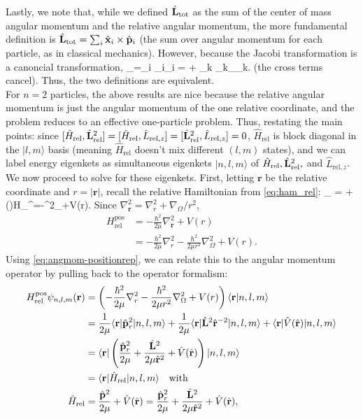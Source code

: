Lastly, we note that, while we defined $\hat{\mathbf{L}}_{\text{tot}}$ as the sum of the center of mass angular momentum and the relative angular momentum, the more fundamental definition is $\hat{\mathbf{L}}_\text{tot}=\sum_i \hat{\mathbf{x}}_i\times\hat{\mathbf{p}}_i$ (the sum over angular momentum for each particle, as in classical mechanics). However, because the Jacobi transformation is a canoncial transformation,
\bea
    _=\sum_i _i\times {}_i = \times {} + \sum_k \vecop{\rho}_k\times {}_{\mathbf{\rho}_k}.
\eea
(the cross terms cancel). Thus, the two definitions are equivalent.\\

For $n=2$ particles, the above results are nice because the relative angular momentum is just the angular momentum of the one relative coordinate, and the problem reduces to an effective one-particle problem. Thus, restating the main points: since $[\hat{H}_\text{rel},\hat{\mathbf{L}}_\text{rel}^2]=[\hat{H}_\text{rel},\hat{L}_{\text{rel},z}]=[\hat{\mathbf{L}}^2_\text{rel}, \hat{L}_{\text{rel},z}]=0$, $\hat{H}_{\text{rel}}$ is block diagonal in the $|l,m\rangle$ basis (meaning $\hat{H}_\text{rel}$ doesn't mix different $(l,m)$ states), and we can label energy eigenkets as simultaneous eigenkets $|n,l,m\rangle$ of $\hat{H}_\text{rel}, \hat{\mathbf{L}}^2_\text{rel},$ and $\hat{L}_{\text{rel},z}$. We now proceed to solve for these eigenkets. First, letting $\mathbf{r}$ be the relative coordinate and $r=|\mathbf{r}|$, recall the relative Hamiltonian from \cref{eq:ham_rel}:
\bea
    _ = +()\rightarrow H_^=-\nabla^2_+V(r).
\eea
Since $\nabla^2_{\mathbf{r}} = \nabla^2_r + \nabla_{\Omega}/r^2$,
\begin{align*}
    H^{\text{pos}}_{\text{rel}} &= -\frac{\hbar^2}{2\mu}\nabla^2_\mathbf{r}+V(r) \\
    &= -\frac{\hbar^2}{2\mu}\nabla^2_r-\frac{\hbar^2}{2\mu r^2}\nabla^2_{\Omega} + V(r).
\end{align*}
Using \cref{eq:angmom-positionrep}, we can relate this to the angular momentum operator by pulling back to the operator formalism:
\begin{align*}
    H_\text{rel}^{\text{pos}}\psi_{n,l,m}(\mathbf{r}) &= \left(-\frac{\hbar^2}{2\mu}\nabla^2_r-\frac{\hbar^2}{2\mu r^2}\nabla^2_{\Omega} + V(r)\right)\langle\mathbf{r}|n,l,m\rangle\\
    &= \frac{1}{2\mu}\langle\mathbf{r}|\hat{\mathbf{p}}^2_{r}|n,l,m\rangle +\frac{1}{2\mu}\langle\mathbf{r}|\hat{\mathbf{L}}^2\hat{\mathbf{r}}^{-2}|n,l,m\rangle+\langle \mathbf{r}|\hat{V}(\hat{\mathbf{r}})|n,l,m\rangle\\
    &= \langle \mathbf{r}|\left(\frac{\hat{\mathbf{p}}^2_r}{2\mu}+\frac{\hat{\mathbf{L}}^2}{2\mu\hat{\mathbf{r}}^2} + \hat{V}(\hat{\mathbf{r}})\right)|n,l,m\rangle\\
    &=\langle \mathbf{r}|\hat{H}_\text{rel}|n,l,m\rangle\quad\text{with}\\
    \hat{H}_\text{rel}&=\frac{\hat{\mathbf{p}}^2}{2\mu}+\hat{V}(\hat{\mathbf{r}})=\frac{\hat{\mathbf{p}}^2_r}{2\mu}+\frac{\hat{\mathbf{L}}^2}{2\mu\hat{\mathbf{r}}^2}+\hat{V}(\hat{\mathbf{r}}),
\end{align*}
